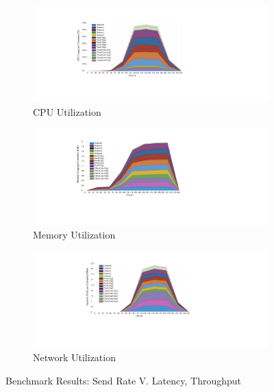 \begin{figure}%
\centering
\begin{subfigure}{0.7\columnwidth}
\includegraphics[width=\columnwidth]{Figures/ICC-cpu.pdf}%
\caption{\ac{CPU} Utilization}%
\label{fig:cpu}%
\end{subfigure}\hfill%
\begin{subfigure}{0.7\columnwidth}
\includegraphics[width=\columnwidth]{Figures/ICC-mem.pdf}%
\caption{Memory Utilization}
\label{fig:mem}
\end{subfigure}\hfill%
\begin{subfigure}{0.7\columnwidth}
\includegraphics[width=\columnwidth]{Figures/ICC-net.pdf}%
\caption{Network Utilization}
\label{fig:net}
\end{subfigure}\hfill%
\caption{Benchmark Results: Send Rate V. Latency, Throughput}
\label{fig_results2}%
\end{figure}


